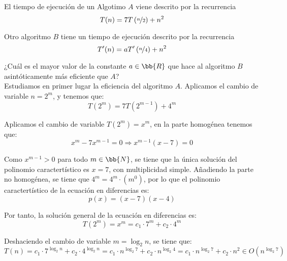 \begin{ejercicio}
    El tiempo de ejecución de un Algotimo $A$ viene descrito por la recurrencia
    \begin{equation*}
        T(n)=7T\left(\nicefrac{n}{2}\right) + n^2
    \end{equation*}

    Otro algoritmo $B$ tiene un tiempo de ejecución descrito por la recurrencia
    \begin{equation*}
        T'(n)=aT'\left(\nicefrac{n}{4}\right) + n^2
    \end{equation*}

    ¿Cuál es el mayor valor de la constante $a\in \bb{R}$ que hace al algoritmo $B$ asintóticamente más eficiente que $A$?\\

    Estudiamos en primer lugar la eficiencia del algoritmo $A$.
    Aplicamos el cambio de variable $n=2^m$, y tenemos que:
    \begin{equation*}
        T(2^m)=7T\left(2^{m-1}\right) + 4^m
    \end{equation*}

    Aplicamos el cambio de variable $T(2^m)=x^m$, en la parte homogénea tenemos que:
    \begin{equation*}
        x^m - 7x^{m-1} = 0 \Longrightarrow x^{m-1}(x-7)=0
    \end{equation*}

    Como $x^{m-1}>0$ para todo $m\in \bb{N}$, se tiene que la única solución del polinomio caractertístico es $x=7$,
    con multiplicidad simple. Añadiendo la parte no homogénea, se tiene que $4^m = 4^m\cdot (m^0)$, por lo que el polinomio caractertístico
    de la ecuación en diferencias es:
    \begin{equation*}
        p(x) = (x-7)(x-4)
    \end{equation*}

    Por tanto, la solución general de la ecuación en diferencias es:
    \begin{equation*}
        T(2^m) = x^m = c_1\cdot 7^m + c_2\cdot 4^m
    \end{equation*}

    Deshaciendo el cambio de variable $m=\log_2 n$, se tiene que:
    \begin{equation*}
        T(n) = c_1\cdot 7^{\log_2 n} + c_2\cdot 4^{\log_2 n} = c_1\cdot n^{\log_2 7} + c_2\cdot n^{\log_2 4} = c_1\cdot n^{\log_2 7} + c_2\cdot n^2 \in O(n^{\log_2 7})
    \end{equation*}


\end{ejercicio}

